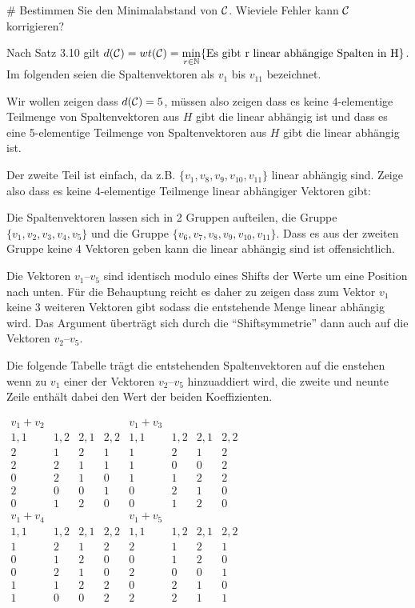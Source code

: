 \begin{myList}
#
Bestimmen Sie den Minimalabstand von $\mathcal{C}$.
Wieviele Fehler kann $\mathcal{C}$ korrigieren?\medskip

Nach Satz 3.10 gilt $d(\mathcal{C}) = wt(\mathcal{C}) = \min\limits_{r \in \mathbb{N}} \lbrace \text{Es gibt r linear abhängige Spalten in H} \rbrace$.
Im folgenden seien die Spaltenvektoren als $v_1$ bis $v_{11}$ bezeichnet.

Wir wollen zeigen dass $d(\mathcal{C}) = 5$, müssen also zeigen dass es keine 4-elementige Teilmenge von Spaltenvektoren aus $H$ gibt die linear abhängig ist und dass es eine 5-elementige Teilmenge von Spaltenvektoren aus $H$ gibt die linear abhängig ist.

Der zweite Teil ist einfach, da z.B. $\lbrace v_1,v_8,v_9,v_{10},v_{11} \rbrace$ linear abhängig sind. Zeige also dass es keine 4-elementige Teilmenge linear abhängiger Vektoren gibt:\medskip

Die Spaltenvektoren lassen sich in 2 Gruppen aufteilen, die Gruppe $\lbrace v_1,v_2,v_3,v_4,v_5 \rbrace$ und die Gruppe $\lbrace v_6,v_7,v_8,v_9,v_{10},v_{11} \rbrace$.
Dass es aus der zweiten Gruppe keine 4 Vektoren geben kann die linear abhängig sind ist offensichtlich.

Die Vektoren $v_1$--$v_5$ sind identisch modulo eines Shifts der Werte um eine Position nach unten.
Für die Behauptung reicht es daher zu zeigen dass zum Vektor $v_1$ keine 3 weiteren Vektoren gibt sodass die entstehende Menge linear abhängig wird.
Das Argument überträgt sich durch die \enquote{Shiftsymmetrie} dann auch auf die Vektoren $v_2$--$v_5$.

Die folgende Tabelle trägt die entstehenden Spaltenvektoren auf die enstehen wenn zu $v_1$ einer der Vektoren $v_2$--$v_5$ hinzuaddiert wird, die zweite und neunte Zeile enthält dabei den Wert der beiden Koeffizienten.
\begin{center}
$
\begin{array}{cccc|cccc}
v_1 + v_2 &  &  &  & v_1 + v_3 &  &  &  \\
1,1 & 1,2 & 2,1 & 2,2 & 1,1 & 1,2 & 2,1 & 2,2 \\
2 & 1 & 2 & 1 & 1 & 2 & 1 & 2 \\
2 & 2 & 1 & 1 & 1 & 0 & 0 & 2 \\
0 & 2 & 1 & 0 & 1 & 1 & 2 & 2 \\
2 & 0 & 0 & 1 & 0 & 2 & 1 & 0 \\
0 & 1 & 2 & 0 & 0 & 1 & 2 & 0 \\
\hline
v_1 + v_4 &  &  &  & v_1 + v_5 &  &  &  \\ 
1,1 & 1,2 & 2,1 & 2,2 & 1,1 & 1,2 & 2,1 & 2,2 \\ 
1 & 2 & 1 & 2 & 2 & 1 & 2 & 1 \\ 
0 & 1 & 2 & 0 & 0 & 1 & 2 & 0 \\ 
0 & 2 & 1 & 0 & 2 & 0 & 0 & 1 \\ 
1 & 1 & 2 & 2 & 0 & 2 & 1 & 0 \\ 
1 & 0 & 0 & 2 & 2 & 2 & 1 & 1 \\
\end{array} 
$
\end{center}


\end{myList}
